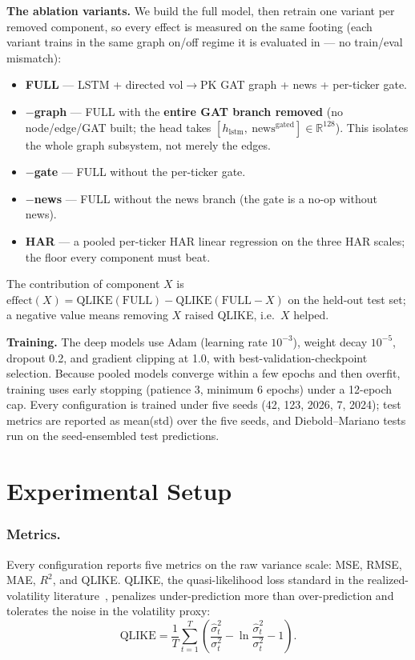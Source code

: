 \documentclass[runningheads]{llncs}
\begin{document}
\noindent\textbf{The ablation variants.} We build the full model, then retrain one variant per removed
component, so every effect is measured on the same footing (each variant trains in the same graph on/off
regime it is evaluated in --- no train/eval mismatch):
\begin{itemize}
\item \textbf{FULL} --- LSTM + directed vol$\to$PK GAT graph + news + per-ticker gate.
\item \textbf{$-$graph} --- FULL with the \textbf{entire GAT branch removed} (no node/edge/GAT built; the
head takes $[h_{\text{lstm}},\ \text{news}^{\text{gated}}]\in\mathbb{R}^{128}$). This isolates the whole
graph subsystem, not merely the edges.
\item \textbf{$-$gate} --- FULL without the per-ticker gate.
\item \textbf{$-$news} --- FULL without the news branch (the gate is a no-op without news).
\item \textbf{HAR} --- a pooled per-ticker HAR linear regression on the three HAR scales; the floor every
component must beat.
\end{itemize}
The contribution of component $X$ is
$\text{effect}(X)=\text{QLIKE}(\text{FULL})-\text{QLIKE}(\text{FULL}{-}X)$ on the held-out test set; a
negative value means removing $X$ raised QLIKE, i.e.\ $X$ helped.

\noindent\textbf{Training.} The deep models use Adam (learning rate $10^{-3}$), weight decay $10^{-5}$,
dropout 0.2, and gradient clipping at 1.0, with best-validation-checkpoint selection. Because pooled models
converge within a few epochs and then overfit, training uses early stopping (patience 3, minimum 6 epochs)
under a 12-epoch cap. Every configuration is trained under five seeds (42, 123, 2026, 7, 2024); test metrics
are reported as mean(std) over the five seeds, and Diebold--Mariano tests run on the seed-ensembled test
predictions.

\section{Experimental Setup}
\label{sec:setup}
\subsubsection{Metrics.}
Every configuration reports five metrics on the raw variance scale: MSE, RMSE, MAE, $R^2$, and QLIKE.
QLIKE, the quasi-likelihood loss standard in the realized-volatility literature~\cite{patton2011},
penalizes under-prediction more than over-prediction and tolerates the noise in the volatility proxy:
\begin{equation}
\text{QLIKE} = \frac{1}{T}\sum_{t=1}^{T}\left(\frac{\hat{\sigma}^2_t}{\sigma^2_t}
 - \ln\frac{\hat{\sigma}^2_t}{\sigma^2_t} - 1\right).
\label{eq:qlike}
\end{equation}
\end{document}
